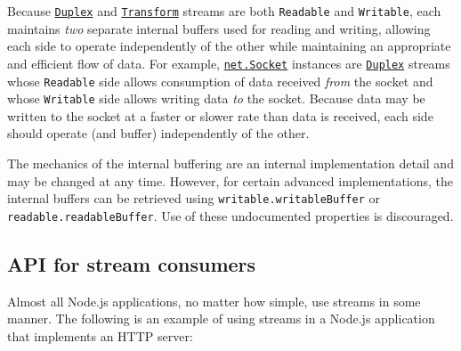 Because \hyperref[class-streamduplex]{\texttt{Duplex}} and
\hyperref[class-streamtransform]{\texttt{Transform}} streams are both
\texttt{Readable} and \texttt{Writable}, each maintains \emph{two}
separate internal buffers used for reading and writing, allowing each
side to operate independently of the other while maintaining an
appropriate and efficient flow of data. For example,
\href{net.md\#class-netsocket}{\texttt{net.Socket}} instances are
\hyperref[class-streamduplex]{\texttt{Duplex}} streams whose
\texttt{Readable} side allows consumption of data received \emph{from}
the socket and whose \texttt{Writable} side allows writing data
\emph{to} the socket. Because data may be written to the socket at a
faster or slower rate than data is received, each side should operate
(and buffer) independently of the other.

The mechanics of the internal buffering are an internal implementation
detail and may be changed at any time. However, for certain advanced
implementations, the internal buffers can be retrieved using
\texttt{writable.writableBuffer} or \texttt{readable.readableBuffer}.
Use of these undocumented properties is discouraged.

\subsection{API for stream consumers}\label{api-for-stream-consumers}

Almost all Node.js applications, no matter how simple, use streams in
some manner. The following is an example of using streams in a Node.js
application that implements an HTTP server:

